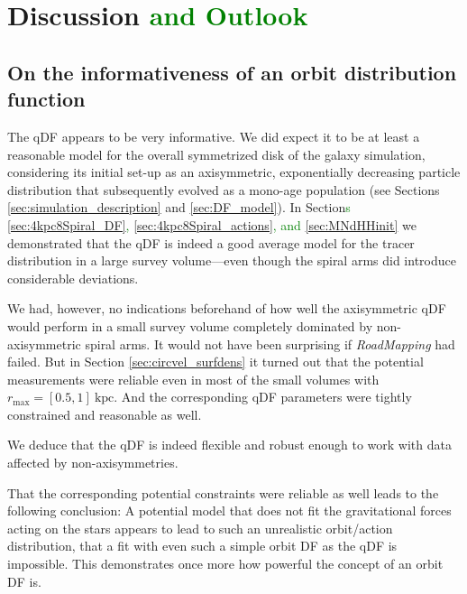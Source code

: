 \documentclass[iop,revtex4,numberedappendix,appendixfloats]{emulateapj}
\newcommand{\RM}{{\sl RoadMapping}}
\newcommand{\NEW}[1]{\textcolor{Green}{#1}}
\newcommand{\OLD}[1]{}
\begin{document}
\section{Discussion \NEW{and Outlook}} \label{sec:discussion}

\subsection{On the informativeness of an orbit distribution function}

The qDF appears to be very informative. We did expect it to be at least a reasonable model for the overall symmetrized disk of the galaxy simulation, considering its initial set-up as an axisymmetric, exponentially decreasing particle distribution that subsequently evolved as a mono-age population (see Sections \ref{sec:simulation_description} and \ref{sec:DF_model}). In Section\NEW{s} \ref{sec:4kpc8Spiral_DF}\NEW{,}\OLD{ and} \ref{sec:4kpc8Spiral_actions}\NEW{, and \ref{sec:MNdHHinit}} we demonstrated that the qDF is indeed a good average model for the tracer distribution in a large survey volume---even though the spiral arms did introduce considerable deviations.

We had, however, no indications beforehand of how well the axisymmetric qDF would perform in a small survey volume completely dominated by non-axisymmetric spiral arms. It would not have been surprising if \RM{} had failed. But in Section \ref{sec:circvel_surfdens} it turned out that the potential measurements were reliable even in most of the small volumes with $r_\text{max}=[0.5,1]~\text{kpc}$. And the corresponding qDF parameters were tightly constrained and reasonable as well. 

We deduce that the qDF is indeed flexible and robust enough to work with data affected by non-axisymmetries.

That the corresponding potential constraints were reliable as well leads to the following conclusion: A potential model that does not fit the gravitational forces acting on the stars appears to lead to such an unrealistic orbit/action distribution, that a fit with even such a simple orbit DF as the qDF is impossible. This demonstrates once more how powerful the concept of an orbit DF is.
\end{document}
